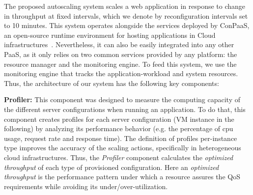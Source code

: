 
The proposed autoscaling system scales a web application in response to change in throughput at fixed intervals, which we denote by reconfiguration intervals set to 10 minutes.  This system operates alongside the services deployed by ConPaaS, an open-source runtime environment for hosting applications in Cloud infrastructures~\cite{conpaasIC}. Nevertheless, it can also be easily integrated into any other PaaS, as it only relies on two common services provided by any platform: the resource manager and the monitoring engine. To feed this system, we use the monitoring engine that tracks the application-workload and system resources. Thus, the architecture of our system has the following key components:



\vspace{2mm}


\textbf{Profiler: } This component was designed to measure the computing capacity of the different server configurations when running an application. To do that, this component creates profiles for each server configuration (VM instance in the following) by analyzing its performance behavior (e.g. the percentage of cpu usage, request rate and response time).  The definition of profiles per-instance type improves the accuracy of the scaling actions, specifically in heterogeneous cloud infrastructures. Thus, the \emph{Profiler} component calculates the \emph{optimized throughput} of each type of provisioned configuration. Here an \emph{optimized throughput} is the performance pattern under which a resource assures the QoS requirements while avoiding its under/over-utilization.




\vspace{2mm}

